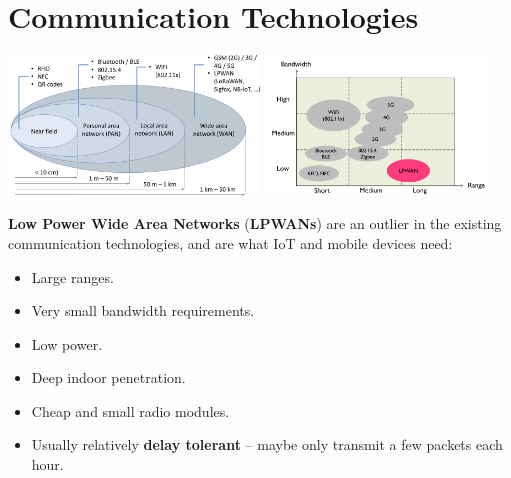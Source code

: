 \documentclass[a4paper, 11pt]{article}
\begin{document}
\section*{Communication Technologies}
{
    \begin{center}
    \includegraphics[width=0.5\textwidth]{commtech1.png}
    \includegraphics[width=0.45\textwidth]{commtech2.png}
    \end{center}

    \textbf{Low Power Wide Area Networks} (\textbf{LPWANs}) are an outlier in the existing communication technologies, and are what IoT and mobile devices need:
    \begin{itemize}
    \item Large ranges.
    \item Very small bandwidth requirements.
    \item Low power.
    \item Deep indoor penetration.
    \item Cheap and small radio modules.
    \item Usually relatively \textbf{delay tolerant} -- maybe only transmit a few packets each hour.
    \end{itemize}

}
\end{document}
